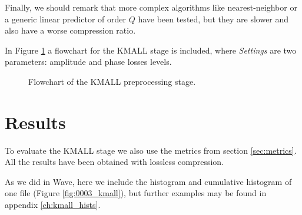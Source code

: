 Finally, we should remark that more complex algorithms like nearest-neighbor or a generic linear predictor of order $Q$ have been tested, but they are slower and also have a worse compression ratio.

\pagebreak
In Figure \ref{fig:kmall_flowchart} a flowchart for the KMALL stage is included, where \textit{Settings} are two parameters: amplitude and phase losses levels.

\begin{figure}[h!]
	\begin{center}
		\scalebox{.95}{}
	\end{center}
	\caption{Flowchart of the KMALL preprocessing stage.}
	\label{fig:kmall_flowchart}
\end{figure}

\section{Results} \label{sec:kmall_results}
To evaluate the KMALL stage we also use the metrics from section \ref{sec:metrics}. All the results have been obtained with lossless compression.

As we did in Wave, here we include the histogram and cumulative histogram of one file (Figure \ref{fig:0003_kmall}), but further examples may be found in appendix \ref{ch:kmall_hists}.

